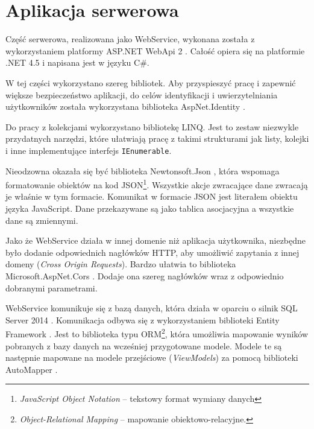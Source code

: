 \documentclass[a4paper]{book}
\begin{document}
		\section{Aplikacja serwerowa}
		
		Część serwerowa, realizowana jako WebService, wykonana została z wykorzystaniem platformy ASP.NET WebApi 2 \cite{id:WebApi}. Całość opiera się na platformie .NET 4.5 i napisana jest w języku C\#.
		
		W tej części wykorzystano szereg bibliotek. Aby przyspieszyć pracę i zapewnić większe bezpieczeństwo aplikacji, do celów identyfikacji i uwierzytelniania użytkowników została wykorzystana biblioteka AspNet.Identity \cite{id:ASPIdentity}.
		
		Do pracy z kolekcjami wykorzystano bibliotekę LINQ. Jest to zestaw niezwykle przydatnych narzędzi, które ułatwiają pracę z takimi strukturami jak listy, kolejki i inne implementujące interfejs \texttt{IEnumerable}.
		
		Nieodzowna okazała się być biblioteka Newtonsoft.Json \cite{id:NewtonsoftJSON}, która wspomaga formatowanie obiektów na kod JSON\footnote{\emph{JavaScript Object Notation} -- tekstowy format wymiany danych}. Wszystkie akcje zwracające dane zwracają je właśnie w tym formacie. Komunikat w formacie JSON jest literałem obiektu języka JavaScript. Dane przekazywane są jako tablica asocjacyjna a wszystkie dane są zmiennymi.
		
		Jako że WebService działa w innej domenie niż aplikacja użytkownika, niezbędne było dodanie odpowiednich nagłówków HTTP, aby umożliwić zapytania z innej domeny (\emph{Cross Origin Requests}). Bardzo ułatwia to biblioteka Microsoft.AspNet.Cors \cite{id:ASPCors}. Dodaje ona szereg nagłówków wraz z odpowiednio dobranymi parametrami.
		
		WebService komunikuje się z bazą danych, która działa w oparciu o silnik SQL Server 2014 \cite{id:SQLServer}. Komunikacja odbywa się z wykorzystaniem biblioteki Entity Framework \cite{id:EntityFramework}. Jest to biblioteka typu ORM\footnote{\emph{Object-Relational Mapping} -- mapowanie obiektowo-relacyjne. },
		która umożliwia mapowanie wyników pobranych z bazy danych na wcześniej przygotowane modele. Modele te są następnie mapowane na modele przejściowe (\emph{ViewModels}) za pomocą biblioteki AutoMapper \cite{id:Automapper}.
		
\end{document}
